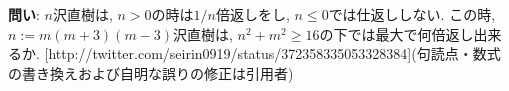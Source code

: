 \documentclass[11pt,a4paper,twocolumn]{jsarticle}
\begin{document}
{\bf 問い}: $n$沢直樹は, $n>0$の時は$1/n$倍返しをし, $n \le 0$では仕返ししない. この時, $n := m(m+3)(m-3)$沢直樹は, $n^2+m^2 \ge 16$の下では最大で何倍返し出来るか. [http://\allowbreak{}twitter.com/seirin0919/status/372358335053\allowbreak{}328384](句読点・数式の書き換えおよび自明な誤りの修正は引用者)
\end{document}
